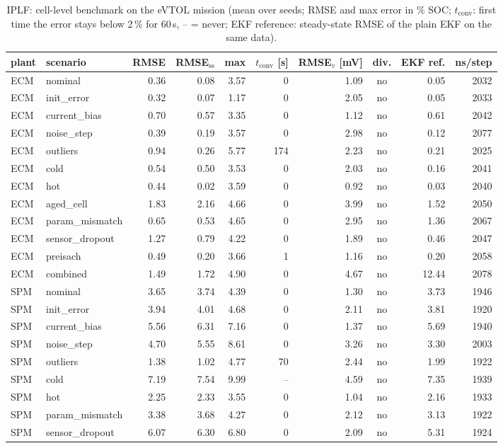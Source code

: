 \begin{table}[H]\centering\footnotesize\setlength{\tabcolsep}{4pt}
\caption{IPLF: cell-level benchmark on the eVTOL mission (mean over seeds; RMSE and max error in \% SOC; $t_\mathrm{conv}$: first time the error stays below 2\,\% for 60\,s, -- = never; EKF reference: steady-state RMSE of the plain EKF on the same data).}\label{tab:cell_IPLF}
\begin{tabular}{llrrrrrcrr}\toprule
plant & scenario & RMSE & RMSE$_\mathrm{ss}$ & max & $t_\mathrm{conv}$ [s] & RMSE$_v$ [mV] & div. & EKF ref. & ns/step \\ \midrule
ECM & nominal & 0.36 & 0.08 & 3.57 & 0 & 1.09 & no & 0.05 & 2032 \\
ECM & init\_error & 0.32 & 0.07 & 1.17 & 0 & 2.05 & no & 0.05 & 2033 \\
ECM & current\_bias & 0.70 & 0.57 & 3.35 & 0 & 1.12 & no & 0.61 & 2042 \\
ECM & noise\_step & 0.39 & 0.19 & 3.57 & 0 & 2.98 & no & 0.12 & 2077 \\
ECM & outliers & 0.94 & 0.26 & 5.77 & 174 & 2.23 & no & 0.21 & 2025 \\
ECM & cold & 0.54 & 0.50 & 3.53 & 0 & 2.03 & no & 0.16 & 2041 \\
ECM & hot & 0.44 & 0.02 & 3.59 & 0 & 0.92 & no & 0.03 & 2040 \\
ECM & aged\_cell & 1.83 & 2.16 & 4.66 & 0 & 3.99 & no & 1.52 & 2050 \\
ECM & param\_mismatch & 0.65 & 0.53 & 4.65 & 0 & 2.95 & no & 1.36 & 2067 \\
ECM & sensor\_dropout & 1.27 & 0.79 & 4.22 & 0 & 1.89 & no & 0.46 & 2047 \\
ECM & preisach & 0.49 & 0.20 & 3.66 & 1 & 1.16 & no & 0.20 & 2058 \\
ECM & combined & 1.49 & 1.72 & 4.90 & 0 & 4.67 & no & 12.44 & 2078 \\
\midrule
SPM & nominal & 3.65 & 3.74 & 4.39 & 0 & 1.30 & no & 3.73 & 1946 \\
SPM & init\_error & 3.94 & 4.01 & 4.68 & 0 & 2.11 & no & 3.81 & 1920 \\
SPM & current\_bias & 5.56 & 6.31 & 7.16 & 0 & 1.37 & no & 5.69 & 1940 \\
SPM & noise\_step & 4.70 & 5.55 & 8.61 & 0 & 3.26 & no & 3.30 & 2003 \\
SPM & outliers & 1.38 & 1.02 & 4.77 & 70 & 2.44 & no & 1.99 & 1922 \\
SPM & cold & 7.19 & 7.54 & 9.99 & -- & 4.59 & no & 7.35 & 1939 \\
SPM & hot & 2.25 & 2.33 & 3.55 & 0 & 1.04 & no & 2.16 & 1933 \\
SPM & param\_mismatch & 3.38 & 3.68 & 4.27 & 0 & 2.12 & no & 3.13 & 1922 \\
SPM & sensor\_dropout & 6.07 & 6.30 & 6.80 & 0 & 2.09 & no & 5.31 & 1924 \\
\bottomrule\end{tabular}\end{table}
